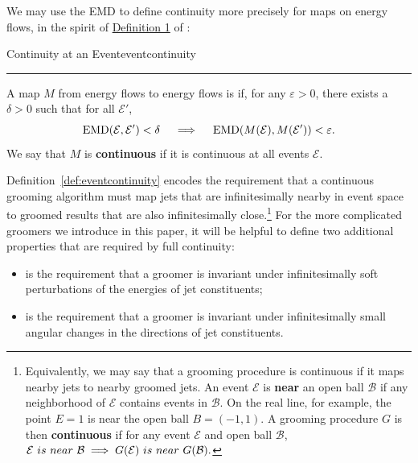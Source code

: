 We may use the EMD to define continuity more precisely for maps on energy flows, in the spirit of \href{https://arxiv.org/pdf/2004.04159.pdf#page=5\&zoom=100,0,350}{Definition 1} of :
%
\begin{definitionbox}{Continuity at an Event}{eventcontinuity}
    \emph{}

    \vspace{7pt}
    \hrule
    \vspace{7pt}

    A map \(M\) from energy flows to energy flows is  if, for any \(\varepsilon > 0\), there exists a \(\delta > 0\) such that for all \(\mathcal E'\),
    \begin{equation*}\label{eq:emdcontinuity}
        {\rm EMD}(\mathcal E,\mathcal E')<\delta
        \quad\implies\quad
        {\rm EMD}(M(\mathcal E), M(\mathcal E')) < \varepsilon.
    \end{equation*}
    We say that \(M\) is \textbf{continuous} if it is continuous at all events \(\mathcal{E}\).
\end{definitionbox}
%
\noindent Definition~\ref{def:eventcontinuity} encodes the requirement that a continuous grooming algorithm must map jets that are infinitesimally nearby in event space to groomed results that are also infinitesimally close.\footnote{
Equivalently, we may say that a grooming procedure is continuous if it maps nearby jets to nearby groomed jets.
%
An event \(\mathcal{E}\) is \textbf{near} an open ball \(\mathcal{B}\) if any neighborhood of \(\mathcal{E}\) contains events in \(\mathcal{B}\).
%
On the real line, for example, the point \(E = 1\) is near the open ball \(B = (-1, 1)\).
%
A grooming procedure \(G\) is then \textbf{continuous} if for any event \(\mathcal{E}\) and open ball \(\mathcal{B}\),
    \(
    \mathcal{E} {\text ~is~ near~} \mathcal{B}
    \implies
    G(\mathcal{E}) {\text~ is~ near~} G(\mathcal{B}).
    \)
}
For the more complicated \PIRANHA{} groomers we introduce in this paper, it will be helpful to define two additional properties that are required by full continuity:
\begin{itemize}
    \item
         is the requirement that a groomer is invariant under infinitesimally soft perturbations of the energies of jet constituents;

    \item
         is the requirement that a groomer is invariant under infinitesimally small angular changes in the directions of jet constituents.
\end{itemize}


